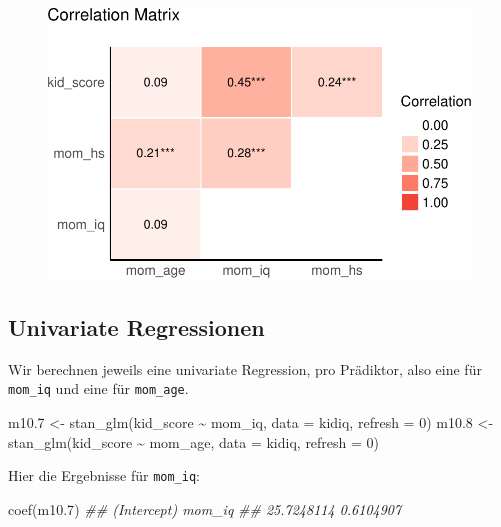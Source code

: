 \documentclass[
  a4paper,
  DIV=11]{scrreprt}
\newenvironment{Shaded}{\begin{snugshade}}{\end{snugshade}}
\newcommand{\AttributeTok}[1]{\textcolor[rgb]{0.40,0.45,0.13}{#1}}
\newcommand{\DecValTok}[1]{\textcolor[rgb]{0.68,0.00,0.00}{#1}}
\newcommand{\DocumentationTok}[1]{\textcolor[rgb]{0.37,0.37,0.37}{\textit{#1}}}
\newcommand{\FloatTok}[1]{\textcolor[rgb]{0.68,0.00,0.00}{#1}}
\newcommand{\FunctionTok}[1]{\textcolor[rgb]{0.28,0.35,0.67}{#1}}
\newcommand{\NormalTok}[1]{\textcolor[rgb]{0.00,0.23,0.31}{#1}}
\newcommand{\OtherTok}[1]{\textcolor[rgb]{0.00,0.23,0.31}{#1}}
\newcommand{\SpecialCharTok}[1]{\textcolor[rgb]{0.37,0.37,0.37}{#1}}
\theoremstyle{definition}
\theoremstyle{remark}
\begin{document}
\begin{figure}[H]

{\centering \includegraphics{./metrische-AV_files/figure-pdf/unnamed-chunk-42-1.pdf}

}

\end{figure}

\hypertarget{univariate-regressionen}{%
\subsection{Univariate Regressionen}\label{univariate-regressionen}}

Wir berechnen jeweils eine univariate Regression, pro Prädiktor, also
eine für \texttt{mom\_iq} und eine für \texttt{mom\_age}.

\begin{Shaded}
\begin{Highlighting}[]
\NormalTok{m10}\FloatTok{.7} \OtherTok{\textless{}{-}} \FunctionTok{stan\_glm}\NormalTok{(kid\_score }\SpecialCharTok{\textasciitilde{}}\NormalTok{ mom\_iq, }\AttributeTok{data =}\NormalTok{ kidiq, }\AttributeTok{refresh =} \DecValTok{0}\NormalTok{)}
\NormalTok{m10}\FloatTok{.8} \OtherTok{\textless{}{-}} \FunctionTok{stan\_glm}\NormalTok{(kid\_score }\SpecialCharTok{\textasciitilde{}}\NormalTok{ mom\_age, }\AttributeTok{data =}\NormalTok{ kidiq, }\AttributeTok{refresh =} \DecValTok{0}\NormalTok{)}
\end{Highlighting}
\end{Shaded}

Hier die Ergebnisse für \texttt{mom\_iq}:

\begin{Shaded}
\begin{Highlighting}[]
\FunctionTok{coef}\NormalTok{(m10}\FloatTok{.7}\NormalTok{)}
\DocumentationTok{\#\# (Intercept)      mom\_iq }
\DocumentationTok{\#\#  25.7248114   0.6104907}
\end{Highlighting}
\end{Shaded}
\end{document}
